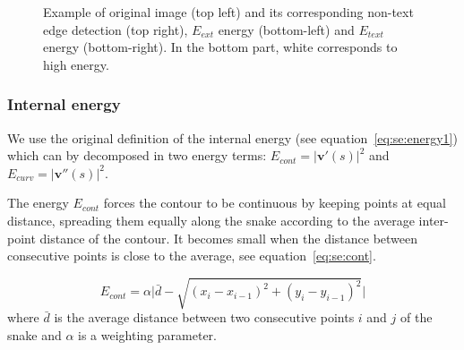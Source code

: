 	\begin{figure}[!ht]	%
	  \centering
		\caption[Active contour energies for open balloon extraction]{Example of original image (top left) and its corresponding non-text edge detection (top right), $E_{ext}$ energy (bottom-left) and $E_{text}$ energy (bottom-right). In the bottom part, white corresponds to high energy.}
		\label{fig:se:distance_transform}
	\end{figure}

\subsubsection{Internal energy}
We use the original definition of the internal energy (see equation~\ref{eq:se:energy1}) which can by decomposed in two energy terms: $E_{cont} = \left|\mathbf{v}'(s) \right|^2$ and $E_{curv}=\left| \mathbf{v}''(s) \right|^2$.
% 

The energy $E_{cont}$ forces the contour to be continuous by keeping points at equal distance, spreading them equally along the snake according to the average inter-point distance of the contour.
It becomes small when the distance between consecutive points is close to the average, see equation~\ref{eq:se:cont}.

\begin{equation}\label{eq:se:cont}
 E_{cont} = \alpha \Big|\bar{d} - \sqrt{(x_i - x_{i-1} )^2 + (y_i - y_{i-1} )^2}\Big|
\end{equation}
where $\bar{d}$ is the average distance between two consecutive points $i$ and $j$ of the snake and $\alpha$ is a weighting parameter.

